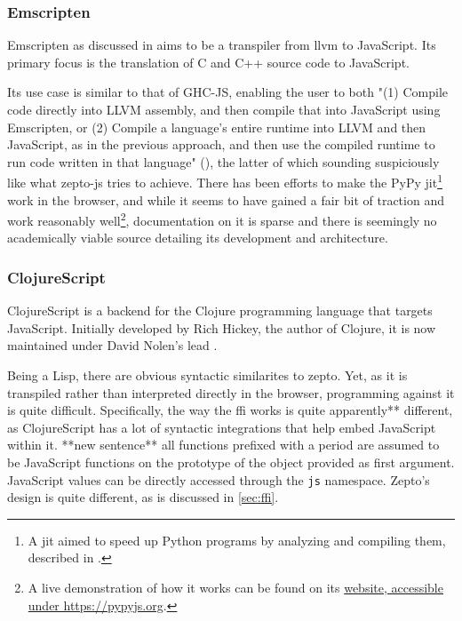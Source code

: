 \documentclass[oneside,11pt,xetex]{scrbook}
\begin{document}
\subsubsection{Emscripten}

Emscripten as discussed in \parencite{ZAKA} aims to be a transpiler from \gls{llvm} to
JavaScript. Its primary focus is the translation of C and C++ source code
to JavaScript.

Its use case is similar to that of GHC-JS, enabling the user to both "(1)
Compile code directly into LLVM assembly, and then compile that into JavaScript
using Emscripten, or (2) Compile a language’s entire runtime into LLVM and then
JavaScript, as in the previous approach, and then use the compiled runtime to
run code written in that language" (\cite{ZAKA}), the latter of which sounding
suspiciously like what zepto-js tries to achieve. There has been efforts to
make the PyPy \gls{jit}\footnote{A \gls{jit} aimed to speed up Python programs
by analyzing and compiling them, described in \parencite{PYPY}.} work in the
browser, and while it seems to have gained a fair bit of traction and work
reasonably well\footnote{A live demonstration of how it works can be found on
its \href{https://pypyjs.org}{website, accessible under https://pypyjs.org}.},
documentation on it is sparse and there is seemingly no academically viable
source detailing its development and architecture.

\subsubsection{ClojureScript}
\label{sec:ClojureScript}

ClojureScript is a backend for the Clojure programming language that targets
JavaScript. Initially developed by Rich Hickey, the author of Clojure, it is
now maintained under David Nolen's lead \parencite{CLJS}.

Being a Lisp, there are obvious syntactic similarites to zepto. Yet, as it is
transpiled rather than interpreted directly in the browser, programming against
it is quite difficult. Specifically, the way the \gls{ffi} works is quite apparently** 
different, as ClojureScript has a lot of syntactic integrations that help embed
JavaScript within it. **new sentence** all functions prefixed with a period are assumed to
be JavaScript functions on the prototype of the object provided as first argument.
JavaScript values can be directly accessed through the \texttt{js} namespace.
Zepto's design is quite different, as is discussed in \ref{sec:ffi}.
\end{document}
